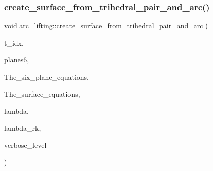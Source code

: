 \mbox{\label{classarc__lifting_a947fc1f7d5456a5654eef22b14c70317}} 
\subsubsection{\texorpdfstring{create\+\_\+surface\+\_\+from\+\_\+trihedral\+\_\+pair\+\_\+and\+\_\+arc()}{create\_surface\_from\_trihedral\_pair\_and\_arc()}}
{\footnotesize\ttfamily void arc\+\_\+lifting\+::create\+\_\+surface\+\_\+from\+\_\+trihedral\+\_\+pair\+\_\+and\+\_\+arc (\begin{DoxyParamCaption}\item[{\mbox{\hyperlink{galois_8h_a09fddde158a3a20bd2dcadb609de11dc}{I\+NT}}}]{t\+\_\+idx,  }\item[{\mbox{\hyperlink{galois_8h_a09fddde158a3a20bd2dcadb609de11dc}{I\+NT}} $\ast$}]{planes6,  }\item[{\mbox{\hyperlink{galois_8h_a09fddde158a3a20bd2dcadb609de11dc}{I\+NT}} $\ast$}]{The\+\_\+six\+\_\+plane\+\_\+equations,  }\item[{\mbox{\hyperlink{galois_8h_a09fddde158a3a20bd2dcadb609de11dc}{I\+NT}} $\ast$}]{The\+\_\+surface\+\_\+equations,  }\item[{\mbox{\hyperlink{galois_8h_a09fddde158a3a20bd2dcadb609de11dc}{I\+NT}} \&}]{lambda,  }\item[{\mbox{\hyperlink{galois_8h_a09fddde158a3a20bd2dcadb609de11dc}{I\+NT}} \&}]{lambda\+\_\+rk,  }\item[{\mbox{\hyperlink{galois_8h_a09fddde158a3a20bd2dcadb609de11dc}{I\+NT}}}]{verbose\+\_\+level }\end{DoxyParamCaption})}

\mbox{\label{classarc__lifting_a67282bbbad70f4de7998d753c0694e0c}} 
